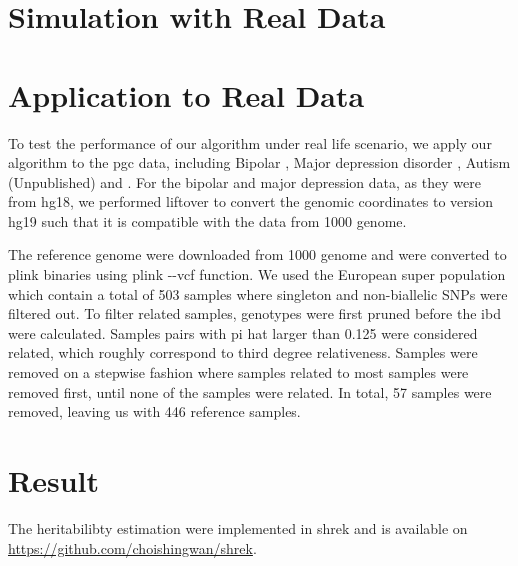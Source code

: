 		
	\section{Simulation with Real Data}
	
	\section{Application to Real Data}
	To test the performance of our algorithm under real life scenario, we apply our algorithm to the \gls{pgc} data, including Bipolar \citep{PsychiatricGWASConsortiumBipolarDisorderWorkingGroup2011}, Major depression disorder \citep{Ripke2013b}, Autism (Unpublished) and  \citep{Ripke2013}.
	For the bipolar and major depression data, as they were from hg18, we performed liftover \citep{Hinrichs2006} to convert the genomic coordinates to version hg19 such that it is compatible with the data from 1000 genome.
	
	The reference genome were downloaded from 1000 genome \citep{Project2012} and were converted to plink binaries using plink -{}-vcf function. 
	We used the European super population which contain a total of 503 samples where singleton and non-biallelic \glspl{SNP} were filtered out.
	To filter related samples, genotypes were first pruned before the \gls{ibd} were calculated.
	Samples pairs with pi hat larger than 0.125 were considered related, which roughly correspond to third degree relativeness. 
	Samples were removed on a stepwise fashion where samples related to most samples were removed first, until none of the samples were related. 
	In total, 57 samples were removed, leaving us with 446 reference samples. 
	
	
	
	
	
	
	\section{Result}
		The heritabilibty estimation were implemented in \gls{shrek} and is available on \url{https://github.com/choishingwan/shrek}.  
